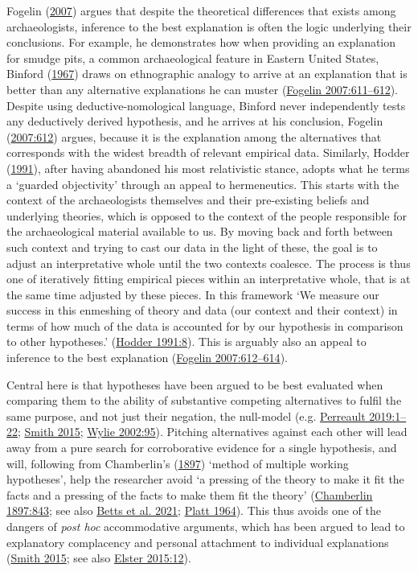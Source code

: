 \documentclass[
  12pt,
  a4paper,
  oneside]{book}
\begin{document}
Fogelin (\protect\hyperlink{ref-fogelin2007}{2007}) argues that despite the theoretical differences that exists among archaeologists, inference to the best explanation is often the logic underlying their conclusions. For example, he demonstrates how when providing an explanation for smudge pits, a common archaeological feature in Eastern United States, Binford (\protect\hyperlink{ref-binford1967}{1967}) draws on ethnographic analogy to arrive at an explanation that is better than any alternative explanations he can muster (\protect\hyperlink{ref-fogelin2007}{Fogelin 2007:611--612}). Despite using deductive-nomological language, Binford never independently tests any deductively derived hypothesis, and he arrives at his conclusion, Fogelin (\protect\hyperlink{ref-fogelin2007}{2007:612}) argues, because it is the explanation among the alternatives that corresponds with the widest breadth of relevant empirical data. Similarly, Hodder (\protect\hyperlink{ref-hodder1991}{1991}), after having abandoned his most relativistic stance, adopts what he terms a `guarded objectivity' through an appeal to hermeneutics. This starts with the context of the archaeologists themselves and their pre-existing beliefs and underlying theories, which is opposed to the context of the people responsible for the archaeological material available to us. By moving back and forth between such context and trying to cast our data in the light of these, the goal is to adjust an interpretative whole until the two contexts coalesce. The process is thus one of iteratively fitting empirical pieces within an interpretative whole, that is at the same time adjusted by these pieces. In this framework `We measure our success in this enmeshing of theory and data (our context and their context) in terms of how much of the data is accounted for by our hypothesis in comparison to other hypotheses.' (\protect\hyperlink{ref-hodder1991}{Hodder 1991:8}). This is arguably also an appeal to inference to the best explanation (\protect\hyperlink{ref-fogelin2007}{Fogelin 2007:612--614}).

Central here is that hypotheses have been argued to be best evaluated when comparing them to the ability of substantive competing alternatives to fulfil the same purpose, and not just their negation, the null-model (e.g. \protect\hyperlink{ref-perreault2019}{Perreault 2019:1--22}; \protect\hyperlink{ref-smith2015}{Smith 2015}; \protect\hyperlink{ref-wylie2002}{Wylie 2002:95}). Pitching alternatives against each other will lead away from a pure search for corroborative evidence for a single hypothesis, and will, following from Chamberlin's (\protect\hyperlink{ref-chamberlin1897}{1897}) `method of multiple working hypotheses', help the researcher avoid `a pressing of the theory to make it fit the facts and a pressing of the facts to make them fit the theory' (\protect\hyperlink{ref-chamberlin1897}{Chamberlin 1897:843}; see also \protect\hyperlink{ref-betts2021}{Betts et al. 2021}; \protect\hyperlink{ref-platt1964}{Platt 1964}). This thus avoids one of the dangers of \emph{post hoc} accommodative arguments, which has been argued to lead to explanatory complacency and personal attachment to individual explanations (\protect\hyperlink{ref-smith2015}{Smith 2015}; see also \protect\hyperlink{ref-elster2015}{Elster 2015:12}).
\end{document}
